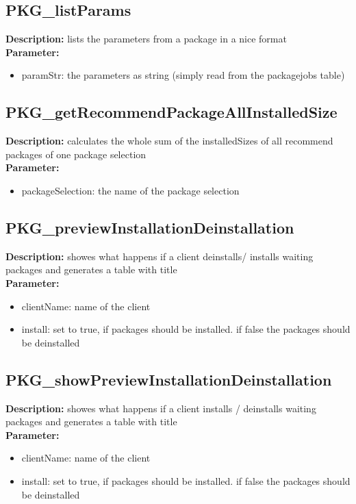 \subsection{PKG\_listParams}
\textbf{Description:} lists the parameters from a package in a nice format\\
\textbf{Parameter:}
\begin{itemize}
\item paramStr: the parameters as string (simply read from the packagejobs table)
\end{itemize}

\subsection{PKG\_getRecommendPackageAllInstalledSize}
\textbf{Description:} calculates the whole sum of the installedSizes of all recommend packages of one package selection\\
\textbf{Parameter:}
\begin{itemize}
\item packageSelection: the name of the package selection
\end{itemize}

\subsection{PKG\_previewInstallationDeinstallation}
\textbf{Description:} showes what happens if a client deinstalls/ installs waiting packages and generates a table with title\\
\textbf{Parameter:}
\begin{itemize}
\item clientName: name of the client
\item install: set to true, if packages should be installed. if false the packages should be deinstalled
\end{itemize}

\subsection{PKG\_showPreviewInstallationDeinstallation}
\textbf{Description:} showes what happens if a client installs / deinstalls waiting packages and generates a table with title\\
\textbf{Parameter:}
\begin{itemize}
\item clientName: name of the client
\item install: set to true, if packages should be installed. if false the packages should be deinstalled
\end{itemize}

